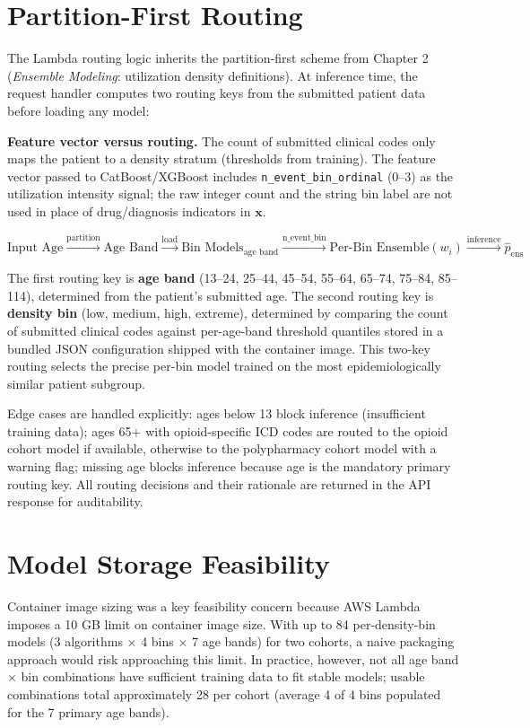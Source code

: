 \documentclass[
  12pt,
]{book}
\begin{document}
\section{Partition-First Routing}\label{partition-first-routing}

The Lambda routing logic inherits the partition-first scheme from
Chapter 2 (\emph{Ensemble Modeling}: utilization density definitions).
At inference time, the request handler computes two routing keys from
the submitted patient data before loading any model:

\textbf{Feature vector versus routing.} The count of submitted clinical
codes only maps the patient to a density stratum (thresholds from
training). The feature vector passed to CatBoost/XGBoost includes
\texttt{n\_event\_bin\_ordinal} (0--3) as the utilization intensity
signal; the raw integer count and the string bin label are not used in
place of drug/diagnosis indicators in \(\mathbf{x}\).

\[\text{Input Age} \xrightarrow{\text{partition}} \text{Age Band}
  \xrightarrow{\text{load}} \text{Bin Models}_{\text{age band}}
  \xrightarrow{\text{n\_event\_bin}} \text{Per-Bin Ensemble}(w_i)
  \xrightarrow{\text{inference}} \hat{p}_{\text{ens}}\]

The first routing key is \textbf{age band} (13--24, 25--44, 45--54,
55--64, 65--74, 75--84, 85--114), determined from the patient's
submitted age. The second routing key is \textbf{density bin} (low,
medium, high, extreme), determined by comparing the count of submitted
clinical codes against per-age-band threshold quantiles stored in a
bundled JSON configuration shipped with the container image. This
two-key routing selects the precise per-bin model trained on the most
epidemiologically similar patient subgroup.

Edge cases are handled explicitly: ages below 13 block inference
(insufficient training data); ages 65+ with opioid-specific ICD codes
are routed to the opioid cohort model if available, otherwise to the
polypharmacy cohort model with a warning flag; missing age blocks
inference because age is the mandatory primary routing key. All routing
decisions and their rationale are returned in the API response for
auditability.

\section{Model Storage Feasibility}\label{model-storage-feasibility}

Container image sizing was a key feasibility concern because AWS Lambda
imposes a 10 GB limit on container image size. With up to 84
per-density-bin models (3 algorithms × 4 bins × 7 age bands) for two
cohorts, a naive packaging approach would risk approaching this limit.
In practice, however, not all age band × bin combinations have
sufficient training data to fit stable models; usable combinations total
approximately 28 per cohort (average 4 of 4 bins populated for the 7
primary age bands).
\end{document}
